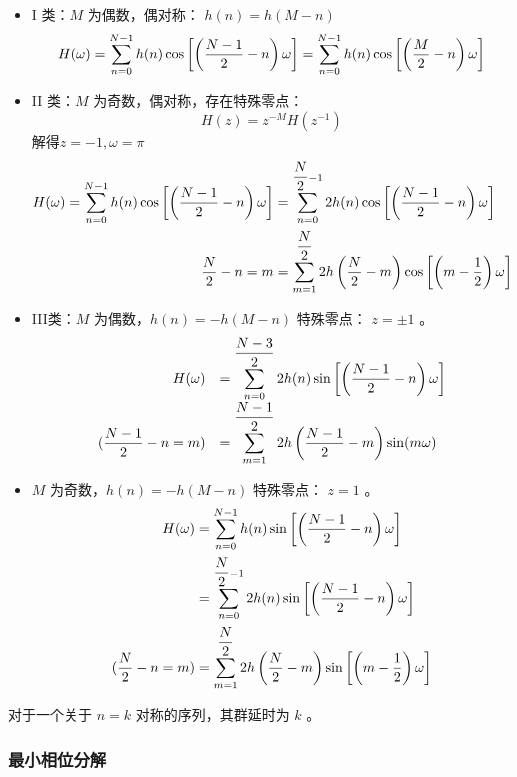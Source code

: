 \documentclass[cn,11pt,chinese,black,simple]{elegantbook}
\begin{document}
\begin{itemize}
    \item I 类：\(M\) 为偶数，偶对称： \(h(n) = h(M-n)\) \[
        H(\omega)=\displaystyle\sum_{n=0}^{N-1} h(n) \cos \left[\left(\dfrac{N-1}{2}-n\right) \omega\right] = \displaystyle\sum_{n=0}^{N-1} h(n) \cos \left[\left(\dfrac{M}{2}-n\right) \omega\right]
        \]
    \item II 类：\(M\) 为奇数，偶对称，存在特殊零点： \[
        H(z)=z^{-M} H\left(z^{-1}\right)
        \] 解得\(z = -1, \omega = \pi\) \[
            \begin{aligned}
            H(\omega)=\displaystyle\sum_{n=0}^{N-1} h(n) \cos \left[\left(\dfrac{N-1}{2}-n\right) \omega\right] &=\displaystyle\sum_{n=0}^{\dfrac{N}{2}-1} 2 h(n) \cos \left[\left(\dfrac{N-1}{2}-n\right) \omega\right] \\
            \text {  } \dfrac{N}{2}-n=m &=\displaystyle\sum_{m=1}^{\dfrac{N}{2}} 2 h\left(\dfrac{N}{2}-m\right) \cos \left[\left(m-\dfrac{1}{2}\right) \omega\right]
            \end{aligned}
            \]
    \item III类：\(M\) 为偶数，\(h(n) = -h(M-n)\) 特殊零点： \(z = \pm 1\) 。\[
        \begin{array}{rl}
        H(\omega) & =\displaystyle\sum_{n=0}^{\dfrac{N-3}{2}} 2 h(n) \sin \left[\left(\dfrac{N-1}{2}-n\right) \omega\right] \\
         (\dfrac{N-1}{2}-n=m) & =\displaystyle\sum_{m=1}^{\dfrac{N-1}{2}} 2 h\left(\dfrac{N-1}{2}-m\right) \sin (m \omega)
        \end{array}
        \]
    \item \(M\) 为奇数，\(h(n) = -h(M-n)\) 特殊零点： \(z = 1\) 。\[
            \begin{aligned}
                H(\omega)&=\displaystyle\sum_{n=0}^{N-1} h(n) \sin \left[\left(\dfrac{N-1}{2}-n\right) \omega\right] \\
                & =\displaystyle\sum_{n=0}^{\dfrac{N}{2}-1} 2 h(n) \sin \left[\left(\dfrac{N-1}{2}-n\right) \omega\right] \\
                (\dfrac{N}{2}-n=m) &=\displaystyle\sum_{m=1}^{\dfrac{N}{2}} 2 h\left(\dfrac{N}{2}-m\right) \sin \left[\left(m-\dfrac{1}{2}\right) \omega\right]
            \end{aligned}
        \]
\end{itemize}

对于一个关于 \(n = k\) 对称的序列，其群延时为 \(k\) 。

\subsubsection{最小相位分解}
\end{document}
